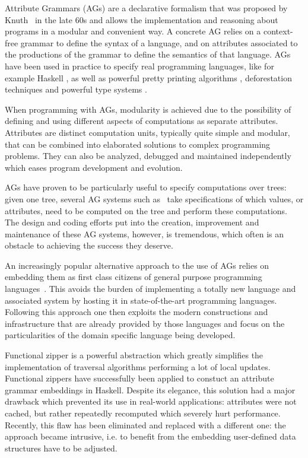 \documentclass[runningheads]{llncs}
\begin{document}
  Attribute Grammars (AGs) are a declarative formalism that was proposed by
  Knuth~\cite{Knuth68} in the late 60s and allows the implementation and
  reasoning about programs in a modular and convenient way. A concrete AG
  relies on a context-free grammar to define the syntax of a language, and on
  attributes associated to the productions of the grammar to define the
  semantics of that language.
  AGs have been used in practice to specify real programming languages, like
  for example Haskell \cite{DijkstraFS09}, as well as powerful pretty printing
  algorithms \cite{SPS99}, deforestation techniques \cite{joao07pepm} and
  powerful type systems \cite{MiddelkoopDS10}.

  When programming with AGs, modularity is achieved due to the possibility of
  defining and using different aspects of computations as separate attributes.
  Attributes are distinct computation units, typically quite simple and modular,
  that can be combined into elaborated solutions to complex programming
  problems. They can also be analyzed, debugged and maintained independently
  which eases program development and evolution.

  AGs have proven to be particularly useful to specify computations over
  trees: given one tree, several AG systems such
  as~\cite{syngen,uuag,lrc,silver} take specifications of which values, or
  attributes, need to be computed on the tree and perform these computations.
  The design and coding efforts put into the creation, improvement and
  maintenance of these AG systems, however, is tremendous, which often is an
  obstacle to achieving the success they deserve.

  An increasingly popular alternative approach to the use of AGs relies on
  embedding them as first class citizens of general purpose programming
  languages~\cite{Oege00,DBLP:conf/sblp/MartinsFS13,erlangAGs,kiama,doaitse09icfp,balestrieri}.
  This avoids the burden of implementing a totally new language and associated
  system by hosting it in state-of-the-art programming languages. Following this
  approach one then exploits the modern constructions and infrastructure that
  are already provided by those languages and focus on the particularities of
  the domain specific language being developed.

  Functional zipper\cite{huet1997zipper} is a powerful abstraction which greatly
  simplifies the implementation of traversal algorithms performing a lot of
  local updates. Functional zippers have successfully been applied to constuct
  an attribute grammar embeddings in Haskell\cite{...}. Despite its elegance,
  this solution had a major drawback which prevented its use in real-world
  applications: attributes were not cached, but rather repeatedly recomputed
  which severely hurt performance. Recently, this flaw has been
  eliminated\cite{...} and replaced with a different one: the approach became
  intrusive, i.e. to benefit from the embedding user-defined data structures
  have to be adjusted.
\end{document}
